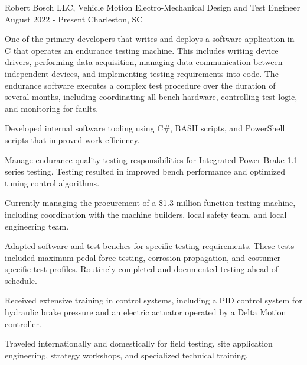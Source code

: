 

\begin{cventries}

  \cventry
    {Robert Bosch LLC, Vehicle Motion} %
    {Electro-Mechanical Design and Test Engineer} %
    {August 2022 - Present} %
    {Charleston, SC} %
    {
      \begin{cvitems} %
     	 \item {One of the primary developers that writes and deploys a software application in C that operates an endurance testing machine. This includes writing device drivers, performing data acquisition, managing data communication between independent devices, and implementing testing requirements into code. The endurance software executes a complex test procedure over the duration of several months, including coordinating all bench hardware, controlling test logic, and monitoring for faults.}
	\item {Developed internal software tooling using C\#, BASH scripts, and PowerShell scripts that improved work efficiency.}
	\item {Manage endurance quality testing responsibilities for Integrated Power Brake 1.1 series testing. Testing resulted in improved bench performance and optimized tuning control algorithms.}
	\item {Currently managing the procurement of a \$1.3 million function testing machine, including coordination with the machine builders, local safety team, and local engineering team.}
	\item {Adapted software and test benches for specific testing requirements. These tests included maximum pedal force testing, corrosion propagation, and costumer specific test profiles. Routinely completed and documented testing ahead of schedule. }
	\item {Received extensive training in control systems, including a PID control system for hydraulic brake pressure and an electric actuator operated by a Delta Motion controller. }
	\item {Traveled internationally and domestically for field testing, site application engineering, strategy workshops, and specialized technical training.}
      \end{cvitems}
    }


\end{cventries}
